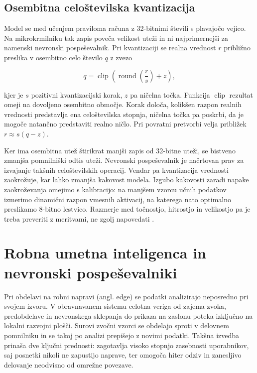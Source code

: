 \subsection{Osembitna celoštevilska kvantizacija}

Model se med učenjem praviloma računa z 32-bitnimi števili s plavajočo vejico.
Na mikrokrmilniku tak zapis poveča velikost uteži in ni najprimernejši za
namenski nevronski pospeševalnik. Pri kvantizaciji se realna vrednost $r$
približno preslika v osembitno celo število $q$ z zvezo

\begin{equation}
  q = \operatorname{clip}\!\left(\operatorname{round}\!\left(\frac{r}{s}\right)
      + z\right),
  \label{eq:kvantizacija}
\end{equation}

kjer je $s$ pozitivni kvantizacijski korak, $z$ pa ničelna točka. Funkcija
$\operatorname{clip}$ rezultat omeji na dovoljeno osembitno območje. Korak
določa, kolikšen razpon realnih vrednosti predstavlja ena celoštevilska
stopnja, ničelna točka pa poskrbi, da je mogoče natančno predstaviti realno
ničlo. Pri povratni pretvorbi velja približek $r\approx s(q-z)$.

Ker ima osembitna utež štirikrat manjši zapis od 32-bitne uteži, se bistveno
zmanjša pomnilniški odtis uteži. Nevronski pospeševalnik je načrtovan
prav za izvajanje takšnih celoštevilskih operacij. Vendar pa kvantizacija vrednosti
zaokrožuje, kar lahko zmanjša kakovost modela. Izgubo kakovosti zaradi napake zaokroževanja 
omejimo s kalibracijo: na manjšem vzorcu učnih podatkov izmerimo dinamični razpon vmesnih
aktivacij, na katerega nato optimalno preslikamo 8-bitno lestvico. Razmerje med točnostjo, 
hitrostjo in velikostjo pa je treba preveriti z meritvami, ne zgolj napovedati \cite{jacob2018quantization}.

\section{Robna umetna inteligenca in nevronski pospeševalniki}

Pri obdelavi na robni napravi (angl. edge) se podatki analizirajo neposredno pri svojem izvoru.
V obravnavanem sistemu celotna veriga od zajema zvoka, predobdelave in nevronskega sklepanja do 
prikaza na zaslonu poteka izključno na lokalni razvojni plošči. Surovi zvočni vzorci se obdelajo
sproti v delovnem pomnilniku in se takoj po analizi prepišejo z novimi podatki. Takšna izvedba 
prinaša dve ključni prednosti: zagotavlja visoko stopnjo zasebnosti uporabnikov, saj posnetki 
nikoli ne zapustijo naprave, ter omogoča hiter odziv in zanesljivo delovanje neodvisno od omrežne povezave.

